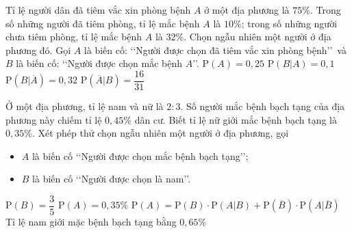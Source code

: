 \begin{ex}%
Tỉ lệ người dân đã tiêm vắc xin phòng bệnh $A$ ở một địa phương là $75\%$. Trong số những người đã tiêm phòng, tỉ lệ mắc bệnh $A$ là $10\%$; trong số những người chưa tiêm phòng, tỉ lệ mắc bệnh $A$ là $32\%$. Chọn ngẫu nhiên một người ở địa phương đó. Gọi $A$ là biến cố: \lq\lq Người được chọn đã tiêm vắc xin phòng bệnh\rq\rq \, và $B$ là biến cố: \lq\lq Người được chọn mắc bệnh $A$\rq\rq.
\choiceTF
{ $\mathrm{P}(A)=0{,}25$}
{\True $\mathrm{P}\left(B|A\right)=0{,}1$}
{\True $\mathrm{P}\left(B|\overline{A}\right)=0{,}32$}
{ \True $\mathrm{P}\left(\overline{A}|B\right)=\dfrac{16}{31}$}
\end{ex}

\begin{ex}%
Ở một địa phương, tỉ lệ nam và nữ là $2 : 3$. Số người mắc bệnh bạch tạng của địa phương này chiếm tỉ lệ $0{,}45\%$ dân cư. Biết tỉ lệ nữ giới mắc bệnh bạch tạng là $0{,}35\%$. Xét phép thử chọn ngẫu nhiên một người ở địa phương, gọi
\begin{itemize}
\item $A$ là biến cố \lq\lq Người được chọn mắc bệnh bạch tạng\rq\rq;
\item $B$ là biến cố \lq\lq Người được chọn là nam\rq\rq.
\end{itemize}
\choiceTF
{ $\mathrm{P}(B)=\dfrac{3}{5}$}
{$\mathrm{P}(A)=0{,}35\%$}
{\True $\mathrm{P}(A) = \mathrm{P}(B)\cdot \mathrm{P}(A|B) + \mathrm{P}\left(\overline{B}\right)\cdot \mathrm{P}\left(A|\overline{B}\right)$}
{\True Tỉ lệ nam giới mặc bệnh bạch tạng bằng $0{,}65\%$}
\end{ex}

